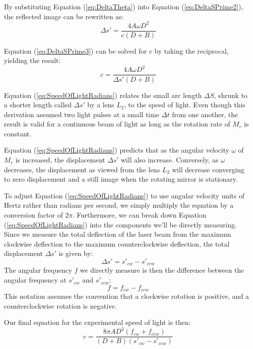 \documentclass[twocolumn]{article}
\begin{document}
	By substituting Equation (\ref{eq:DeltaTheta}) into Equation (\ref{eq:DeltaSPrime2}), the reflected image can be rewritten as:
	\begin{equation}
		\Delta s' = \frac{4A\omega D^2}{c(D+B)}
		\label{eq:DeltaSPrime3}
	\end{equation}
	
	Equation (\ref{eq:DeltaSPrime3}) can be solved for c by taking the reciprocal, yielding the result:
	\begin{equation}
		c = \frac{4A\omega D^2}{\Delta s'(D+B)}
		\label{eq:SpeedOfLightRadians}
	\end{equation}
	
	Equation (\ref{eq:SpeedOfLightRadians}) relates the small arc length $\Delta S$, shrunk to a shorter length called $\Delta s'$ by a lens $L_2$, to the speed of light. 
	Even though this derivation assumed two light pulses at a small time $\Delta t$ from one another, the result is valid for a continuous beam of light as long as the rotation rate of $M_r$ is constant. 
	
	Equation (\ref{eq:SpeedOfLightRadians}) predicts that as the angular velocity $\omega$ of $M_r$ is increased, the displacement $\Delta s'$ will also increase. 
	Conversely, as $\omega$ decreases, the displacement as viewed from the lens $L_2$ will decrease converging to zero displacement and a still image when the rotating mirror is stationary. 
	
	To adjust Equation (\ref{eq:SpeedOfLightRadians}) to use angular velocity units of Hertz rather than radians per second, we simply multiply the equation by a conversion factor of $2\pi$.
	Furthermore, we can break down Equation (\ref{eq:SpeedOfLightRadians}) into the components we'll be directly measuring.
	Since we measure the total deflection of the laser beam from the maximum clockwise deflection to the maximum counterclockwise deflection, the total displacement $\Delta s'$ is given by:
	\begin{equation}
		\Delta s' = s'_{cw} - s'_{ccw}
	\end{equation} 
	The angular frequency $f$ we directly measure is then the difference between the angular frequency at $s'_{cw}$ and $s'_{ccw}$:
	\begin{equation}
		f = f_{cw} - f_{ccw}
	\end{equation}
	This notation assumes the convention that a clockwise rotation is positive, and a counterclockwise rotation is negative.
	
	Our final equation for the experimental speed of light is then:
	\begin{equation} \label{eq:SpeedofLightCalc1}
	c = \frac{ 8\pi AD^2 (f_{cw} + f_{ccw})}
	{ (D + B) (s'_{cw} - s'_{ccw})}
	\end{equation}
	
\end{document}
